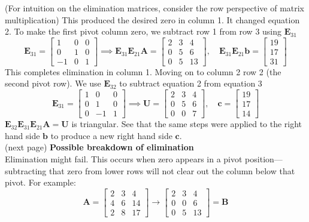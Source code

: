 \documentclass{report}
\begin{document}
(For intuition on the elimination matrices, consider the row perspective of matrix multiplication) This produced the desired zero in column 1. It changed equation 2.
To make the first pivot column zero, we subtract row 1 from row 3 using $\bm E_{31}$
\begin{equation*}
\bm E_{31}=\left[\begin{array}{ccc}
1&0&0\\
0&1&0\\
-1&0&1
\end{array}\right]\implies
\bm E_{31}\bm E_{21}\bm A=\left[\begin{array}{ccc}
2&3&4\\
0&5&6\\
0&5&13
\end{array}\right],\quad
\bm E_{31}\bm E_{21}\bm b=\left[\begin{array}{c}
19\\17\\31
\end{array}\right]
\end{equation*}
This completes elimination in column 1. Moving on to column 2 row 2 (the second pivot row). We use $\bm E_{32}$ to subtract equation 2 from equation 3
\begin{equation*}
\bm E_{31}=\left[\begin{array}{ccc}
1&0&0\\
0&1&0\\
0&-1&1
\end{array}\right]\implies
\bm U=\left[\begin{array}{ccc}
2&3&4\\
0&5&6\\
0&0&7
\end{array}\right],\quad
\bm c=\left[\begin{array}{c}
19\\17\\14
\end{array}\right]
\end{equation*}
$\bm E_{32}\bm E_{31}\bm E_{21}\bm A=\bm U$ is triangular. See that the same steps were applied to the right hand side 
$\bm b$ to produce a new right hand side $\bm c$.\\
(next page)\newpage
\noindent\textbf{Possible breakdown of elimination}\\
Elimination might fail. This occurs when zero appears in a pivot position---subtracting that zero from lower rows will not clear out the column
below that pivot. For example:
\begin{equation*}
\bm A=\left[\begin{array}{ccc}
2&3&4\\
4&6&14\\
2&8&17
\end{array}\right]\to
\left[\begin{array}{ccc}
2&3&4\\
0&0&6\\
0&5&13
\end{array}\right]=\bm B
\end{equation*}
\end{document}
